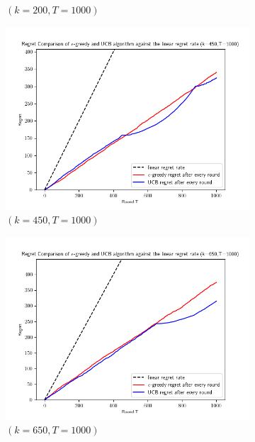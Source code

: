 \documentclass[12pt]{article}
\begin{document}
\begin{enumerate}
\begin{figure}[h!]
\begin{subfigure}[b]{0.3\textwidth}
					\caption{$(k=200, T=1000)$}
				\end{subfigure}
				
				\begin{subfigure}[b]{0.3\textwidth}
					\centering
					\includegraphics[width=\textwidth]{fig3.png}
					\caption{$(k=450, T=1000)$}
				\end{subfigure}
				\hfill
				\begin{subfigure}[b]{0.3\textwidth}
					\centering
					\includegraphics[width=\textwidth]{fig4.png}
					\caption{$(k=650, T=1000)$}
				\end{subfigure}
				\hfill
				\begin{subfigure}[b]{0.3\textwidth}
					\centering

\end{subfigure}
\end{figure}
\end{enumerate}
\end{document}
